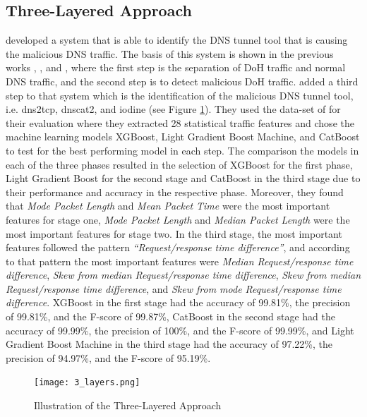 \subsection{Three-Layered Approach} \label{3layers}
\cite{MitsuhashiEtAl_IdentifyingmaliciousDNSTunnelTools} developed a system that is able to identify the DNS tunnel tool that is causing the malicious DNS traffic. The basis of this system is shown in the previous works \cite{SinghRoy_DetectingMalicousDoHTrafficML}, \cite{Banadaki_DetectingMalicousDoHTrafficinDNSUsingML}, and \cite{BehnkeEtAl_FeatureEngineeringMLModelMaliciusDoHTraffic}, where the first step is the separation of DoH traffic and normal DNS traffic, and the second step is to detect malicious DoH traffic. \cite{MitsuhashiEtAl_IdentifyingmaliciousDNSTunnelTools} added a third step to that system which is the identification of the malicious DNS tunnel tool, i.e. dns2tcp, dnscat2, and iodine (see Figure \ref{fig:3_layers}). They used the data-set of \cite{montazerishatoori2020anomaly} for their evaluation where they extracted 28 statistical traffic features and chose the machine learning models XGBoost, Light Gradient Boost Machine, and CatBoost to test for the best performing model in each step. The comparison the models in each of the three phases resulted in the selection of XGBoost for the first phase, Light Gradient Boost for the second stage and CatBoost in the third stage due to their performance and accuracy in the respective phase. Moreover, they found that \textit{Mode Packet Length} and \textit{Mean Packet Time} were the most important features for stage one, \textit{Mode Packet Length} and \textit{Median Packet Length} were the most important features for stage two. In the third stage, the most important features followed the pattern \textit{“Request/response time difference”}, and according to that pattern the most important features were \textit{Median Request/response time difference}, \textit{Skew from median Request/response time difference}, \textit{Skew from median Request/response time difference}, and \textit{Skew from mode Request/response time difference}. XGBoost in the first stage had the accuracy of 99.81\%, the precision of 99.81\%, and the F-score of 99.87\%, CatBoost in the second stage had the accuracy of 99.99\%, the precision of 100\%, and the F-score of 99.99\%, and Light Gradient Boost Machine in the third stage had the accuracy of 97.22\%, the precision of 94.97\%, and the F-score of 95.19\%.

\begin{figure} [ht]
\texttt{[image: 3\_layers.png]}
\centering
\caption{Illustration of the Three-Layered Approach}
\label{fig:3_layers}
\end{figure}

